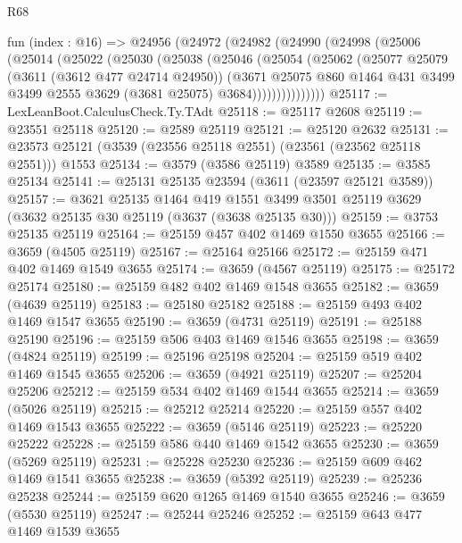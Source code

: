 \begin{lexlean}{R68}
\begin{coremodule}
    fun (index : @16) =>
    @24956
      (@24972
        (@24982
          (@24990
            (@24998
              (@25006
                (@25014
                  (@25022
                    (@25030
                      (@25038
                        (@25046
                          (@25054
                            (@25062
                              (@25077
                                @25079
                                (@3611 (@3612 @477 @24714 @24950))
                                (@3671
                                  @25075
                                  @860
                                  @1464
                                  @431
                                  @3499
                                  @3499
                                  @2555
                                  @3629
                                  (@3681 @25075)
                                  @3684)))))))))))))))
@25117 := LexLeanBoot.CalculusCheck.Ty.TAdt
@25118 := @25117 @2608
@25119 := @23551 @25118
@25120 := @2589 @25119
@25121 := @25120 @2632
@25131 := @23573 @25121 (@3539 (@23556 @25118 @2551) (@23561 (@23562 @25118 @2551))) @1553
@25134 := @3579 (@3586 @25119) @3589
@25135 := @3585 @25134
@25141 := @25131 @25135 @23594 (@3611 (@23597 @25121 @3589))
@25157 := @3621
    @25135
    @1464
    @419
    @1551
    @3499
    @3501
    @25119
    @3629
    (@3632 @25135 @30 @25119 (@3637 (@3638 @25135 @30)))
@25159 := @3753 @25135 @25119
@25164 := @25159 @457 @402 @1469 @1550 @3655
@25166 := @3659 (@4505 @25119)
@25167 := @25164 @25166
@25172 := @25159 @471 @402 @1469 @1549 @3655
@25174 := @3659 (@4567 @25119)
@25175 := @25172 @25174
@25180 := @25159 @482 @402 @1469 @1548 @3655
@25182 := @3659 (@4639 @25119)
@25183 := @25180 @25182
@25188 := @25159 @493 @402 @1469 @1547 @3655
@25190 := @3659 (@4731 @25119)
@25191 := @25188 @25190
@25196 := @25159 @506 @403 @1469 @1546 @3655
@25198 := @3659 (@4824 @25119)
@25199 := @25196 @25198
@25204 := @25159 @519 @402 @1469 @1545 @3655
@25206 := @3659 (@4921 @25119)
@25207 := @25204 @25206
@25212 := @25159 @534 @402 @1469 @1544 @3655
@25214 := @3659 (@5026 @25119)
@25215 := @25212 @25214
@25220 := @25159 @557 @402 @1469 @1543 @3655
@25222 := @3659 (@5146 @25119)
@25223 := @25220 @25222
@25228 := @25159 @586 @440 @1469 @1542 @3655
@25230 := @3659 (@5269 @25119)
@25231 := @25228 @25230
@25236 := @25159 @609 @462 @1469 @1541 @3655
@25238 := @3659 (@5392 @25119)
@25239 := @25236 @25238
@25244 := @25159 @620 @1265 @1469 @1540 @3655
@25246 := @3659 (@5530 @25119)
@25247 := @25244 @25246
@25252 := @25159 @643 @477 @1469 @1539 @3655

\end{coremodule}
\end{lexlean}
